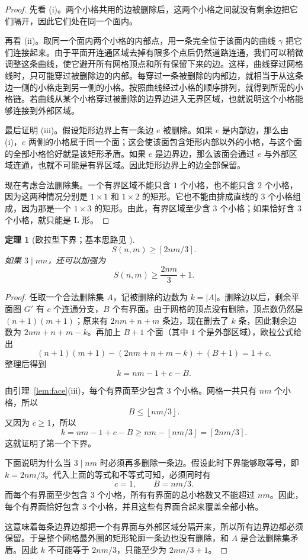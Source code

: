 \documentclass[11pt]{ctexart}
\newtheorem{theorem}{定理}[section]
\theoremstyle{definition}
\newcommand{\ceil}[1]{\left\lceil #1 \right\rceil}
\newcommand{\floor}[1]{\left\lfloor #1 \right\rfloor}
\begin{document}
\begin{proof}
先看 (i)。两个小格共用的边被删除后，这两个小格之间就没有剩余边把它们隔开，因此它们处在同一个面内。

再看 (ii)。取同一个面内两个小格的内部点，用一条完全位于该面内的曲线 $\gamma$ 把它们连接起来。由于平面开连通区域去掉有限多个点后仍然道路连通，我们可以稍微调整这条曲线，使它避开所有网格顶点和所有保留下来的边。这样，曲线穿过网格线时，只可能穿过被删除边的内部。每穿过一条被删除的内部边，就相当于从这条边一侧的小格走到另一侧的小格。按照曲线经过小格的顺序排列，就得到所需的小格链。若曲线从某个小格穿过被删除的边界边进入无界区域，也就说明这个小格能够连接到外部区域。

最后证明 (iii)。假设矩形边界上有一条边 $e$ 被删除。如果 $e$ 是内部边，那么由 (i)，$e$ 两侧的小格属于同一个面；这会使该面包含矩形内部以外的小格，与这个面的全部小格恰好就是该矩形矛盾。如果 $e$ 是边界边，那么该面会通过 $e$ 与外部区域连通，也就不可能是有界区域。因此矩形边界上的边全部保留。

现在考虑合法删除集。一个有界区域不能只含 $1$ 个小格，也不能只含 $2$ 个小格，因为这两种情况分别是 $1\times1$ 和 $1\times2$ 的矩形。它也不能由排成直线的 $3$ 个小格组成，因为那是一个 $1\times3$ 的矩形。由此，有界区域至少含 $3$ 个小格；如果恰好含 $3$ 个小格，就只能是 L 形。
\end{proof}

\begin{theorem}[欧拉型下界；基本思路见 \cite{NT25}]\label{thm:euler}
\[
S(n,m)\ge\ceil{2nm/3}.
\]
如果 $3\mid nm$，还可以加强为
\[
S(n,m)\ge\frac{2nm}{3}+1.
\]
\end{theorem}

\begin{proof}
任取一个合法删除集 $A$，记被删除的边数为 $k=|A|$。删除边以后，剩余平面图 $G'$ 有 $c$ 个连通分支，$B$ 个有界面。由于网格的顶点没有删除，顶点数仍然是 $(n+1)(m+1)$；原来有 $2nm+n+m$ 条边，现在删去了 $k$ 条，因此剩余边数为 $2nm+n+m-k$。再加上 $B+1$ 个面（其中 $1$ 个是外部区域），欧拉公式给出
\[
(n+1)(m+1)-(2nm+n+m-k)+(B+1)=1+c.
\]
整理后得到
\[
k=nm-1+c-B.
\]

由引理~\ref{lem:face}(iii)，每个有界面至少包含 $3$ 个小格。网格一共只有 $nm$ 个小格，所以
\[
B\le\floor{nm/3}.
\]
又因为 $c\ge1$，所以
\[
k=nm-1+c-B
\ge nm-\floor{nm/3}
=\ceil{2nm/3}.
\]
这就证明了第一个下界。

下面说明为什么当 $3\mid nm$ 时必须再多删除一条边。假设此时下界能够取等号，即 $k=2nm/3$。代入上面的等式和不等式可知，必须同时有
\[
c=1,\qquad B=nm/3.
\]
而每个有界面至少包含 $3$ 个小格，所有有界面的总小格数又不能超过 $nm$。因此，每个有界面恰好包含 $3$ 个小格，并且这些有界面合起来覆盖全部小格。

这意味着每条边界边都把一个有界面与外部区域分隔开来，所以所有边界边都必须保留。于是整个网格最外圈的矩形轮廓一条边也没有删除，和 $A$ 是合法删除集矛盾。因此 $k$ 不可能等于 $2nm/3$，只能至少为 $2nm/3+1$。
\end{proof}
\end{document}
